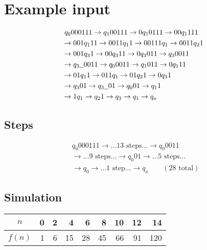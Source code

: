 \documentclass{notes}
\begin{document}
  \section*{Example input}
  
  \begin{align*}
    &\           q_0 000111    \rightarrow  q_1 00111  \rightarrow 0 q_1 0111 \rightarrow 00 q_1 111 \\
    &\rightarrow 001 q_1 11    \rightarrow 0011 q_1 1  \rightarrow 00111 q_1  \rightarrow 0011 q_2 1 \\
    &\rightarrow 001 q_3 1     \rightarrow 00 q_3 11   \rightarrow 0 q_3 011  \rightarrow q_3 0011   \\
    &\rightarrow q_3 \underline{\hspace{2mm}} 0011 \rightarrow q_0 0011    \rightarrow q_1 011    \rightarrow 0 q_1 11   \\
    &\rightarrow 01 q_1 1      \rightarrow 011 q_1     \rightarrow 01 q_2 1   \rightarrow 0 q_3 1    \\
    &\rightarrow q_3 01        \rightarrow q_3 \underline{\hspace{2mm}} 01 \rightarrow q_0 01     \rightarrow q_1 1      \\
    &\rightarrow 1 q_1         \rightarrow q_2 1       \rightarrow q_3        \rightarrow q_1 \rightarrow q_a \\
  \end{align*}

  \subsection*{Steps}
  \begin{align*}
    &q_0 000111 \rightarrow \ldots 13 \textrm{ steps} \ldots \rightarrow q_0 0011 \\
    &\rightarrow \ldots 9 \textrm{ steps} \ldots \rightarrow q_0 01 \rightarrow \ldots 5 \textrm{ steps} \ldots\\
    & \rightarrow q_0 \rightarrow \ldots 1 \textrm{ step} \ldots \rightarrow q_a \qquad (28 \textrm{ total})
  \end{align*}
  
  
    \subsection*{Simulation}
    
    \begin{center}
    \begin{tabular}{crrrrrrrr}
      \toprule
      $n$   & 0 &  2 &  4 &  6 &  8 & 10 & 12 &  14 \\
      \midrule
      $f(n)$ & 1 &  6 & 15 & 28 & 45 & 66 & 91 & 120 \\
      \bottomrule
    \end{tabular}
    \end{center}
    
\end{document}
